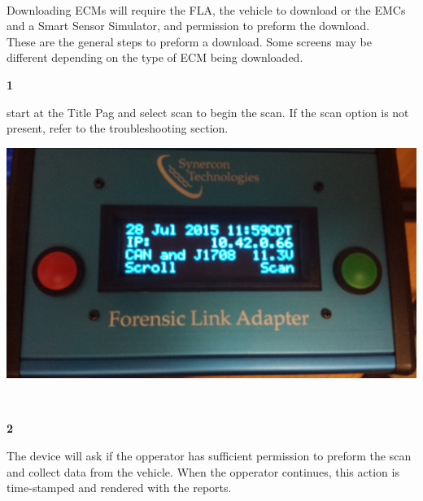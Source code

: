 \documentclass[11pt, oneside]{book}
\begin{document}
\paragraph{  }
Downloading ECMs will require the FLA, the vehicle to download or the EMCs and a Smart Sensor Simulator, and permission to preform the download.
\\
These are the general steps to preform a download. Some screens may be different depending on the type of ECM being downloaded.
\\[\baselineskip]
\noindent\begin{minipage}{0.45\textwidth}%
\begin{center}
\textbf{1}\\[\baselineskip]
\end{center}
start at the Title Pag and select scan to begin the scan. If the scan option is not present, refer to the troubleshooting section.
\end{minipage}%
\hfill%
\begin{minipage}{0.45\textwidth}
\includegraphics[width=\linewidth]{../media/fla_screens/title_screen}
\end{minipage}
\\[\baselineskip]\noindent\begin{minipage}{0.45\textwidth}%
\begin{center}
\textbf{2}\\[\baselineskip]
\end{center}
The device will ask if the opperator has sufficient permission to preform the scan and collect data from the vehicle. When the opperator continues, this action is time-stamped and rendered with the reports.
\end{minipage}%
\hfill%
\end{document}
